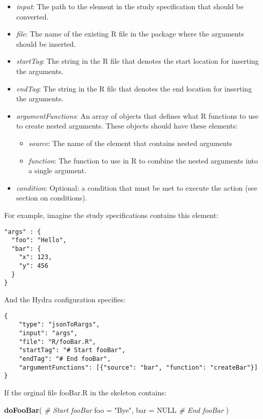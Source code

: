 \documentclass[]{article}
\newenvironment{Shaded}{\begin{snugshade}}{\end{snugshade}}
\newcommand{\CommentTok}[1]{\textcolor[rgb]{0.56,0.35,0.01}{\textit{#1}}}
\newcommand{\DataTypeTok}[1]{\textcolor[rgb]{0.13,0.29,0.53}{#1}}
\newcommand{\KeywordTok}[1]{\textcolor[rgb]{0.13,0.29,0.53}{\textbf{#1}}}
\newcommand{\NormalTok}[1]{#1}
\newcommand{\OtherTok}[1]{\textcolor[rgb]{0.56,0.35,0.01}{#1}}
\newcommand{\StringTok}[1]{\textcolor[rgb]{0.31,0.60,0.02}{#1}}
\providecommand{\tightlist}{%
  \setlength{\itemsep}{0pt}\setlength{\parskip}{0pt}}
\begin{document}
\begin{itemize}
\tightlist
\item
  \emph{input}: The path to the element in the study specification that
  should be converted.
\item
  \emph{file}: The name of the existing R file in the package where the
  arguments should be inserted.
\item
  \emph{startTag}: The string in the R file that denotes the start
  location for inserting the arguments.
\item
  \emph{endTag}: The string in the R file that denotes the end location
  for inserting the arguments.
\item
  \emph{argumentFunctions}: An array of objects that defines what R
  functions to use to create nested arguments. These objects should have
  these elements:

  \begin{itemize}
  \tightlist
  \item
    \emph{source}: The name of the element that contains nested
    arguments
  \item
    \emph{function}: The function to use in R to combine the nested
    arguments into a single argument.
  \end{itemize}
\item
  \emph{condition}: Optional: a condition that must be met to execute
  the action (see section on conditions).
\end{itemize}

For example, imagine the study specifications contains this element:

\begin{verbatim}
"args" : {
  "foo": "Hello",
  "bar": {
    "x": 123,
    "y": 456
  }
}
\end{verbatim}

And the Hydra configuration specifies:

\begin{verbatim}
{
    "type": "jsonToRargs",
    "input": "args",
    "file": "R/fooBar.R",
    "startTag": "# Start fooBar",
    "endTag": "# End fooBar",
    "argumentFunctions": [{"source": "bar", "function": "createBar"}]
}
\end{verbatim}

If the orginal file fooBar.R in the skeleton contains:

\begin{Shaded}
\begin{Highlighting}[]
\KeywordTok{doFooBar}\NormalTok{(}
  \CommentTok{# Start fooBar}
  \DataTypeTok{foo =} \StringTok{"Bye"}\NormalTok{,}
  \DataTypeTok{bar =} \OtherTok{NULL}
  \CommentTok{# End fooBar}
\NormalTok{)}
\end{Highlighting}
\end{Shaded}
\end{document}
